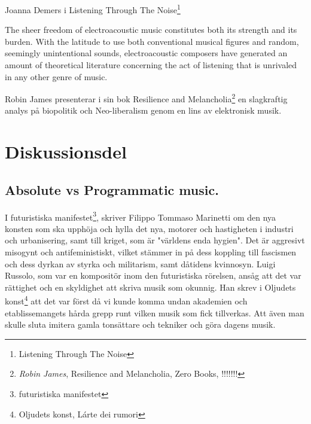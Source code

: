 \documentclass{article}
\begin{document}
  Joanna Demers i Listening Through The Noise\footnote{Listening Through The Noise}


		The sheer freedom of electroacoustic music constitutes both its strength and its burden. With the
		latitude to use both conventional musical figures and random, seemingly unintentional sounds,
		electroacoustic composers have generated an amount of theoretical literature concerning the act of
		listening that is unrivaled in any other genre of music.



  Robin James presenterar i sin bok Resilience and Melancholia\footnote{\emph{Robin James}, Resilience and
  Melancholia, Zero Books, !!!!!!!} en slagkraftig analys på biopolitik och Neo-liberalism genom en lins av 
  elektronisk musik. 



\section{Diskussionsdel}
\subsection{Absolute vs Programmatic music.}


  I futuristiska manifestet\footnote{futuristiska manifestet}, skriver Filippo Tommaso Marinetti om den nya
  konsten som ska upphöja och hylla det nya, motorer och hastigheten i industri och urbanisering, samt till
  kriget, som är "världens enda hygien". Det är aggresivt misogynt och antifeministiskt, vilket stämmer in på
  dess koppling till fascismen och dess dyrkan av styrka och militarism, samt dåtidens kvinnosyn.
  Luigi Russolo, som var en kompositör inom den futuristiska rörelsen, ansåg att det var rättighet och en
  skyldighet att skriva musik som okunnig. Han skrev i Oljudets konst\footnote{Oljudets konst, Lárte dei
  rumori} att det var först då vi kunde komma undan akademien och etablissemangets hårda grepp runt vilken
  musik som fick tillverkas. Att även  man skulle sluta imitera gamla tonsättare och tekniker och göra dagens
  musik.
\end{document}
